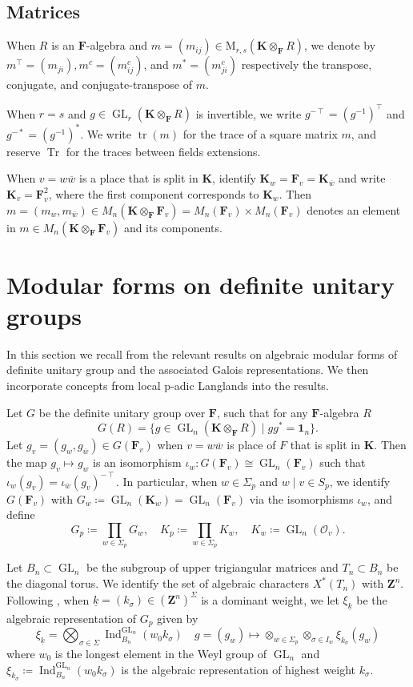 \documentclass[leqno]{amsart}
\newcommand{\wt}[1]{\underline{ #1 }}
\newcommand{\bw}{\overline{w}}
\DeclareMathOperator{\GL}{GL}
\DeclareMathOperator{\mtr}{tr}
\newcommand{\id}{\mathbf{1}}
\newcommand{\Z}{{\mathbf{Z}}}
\DeclareMathOperator{\Tr}{Tr} %
\newcommand{\F}{{\mathbf{F}}} %
\newcommand{\K}{{\mathbf{K}}} %
\newcommand{\oo}{\mathcal{O}} %
\DeclareMathOperator{\Ind}{Ind}
\theoremstyle{definition}
\theoremstyle{remark}
\begin{document}
\subsection{Matrices}
When $R$ is an $\F$-algebra and 
$m=(m_{ij})\in \text{M}_{r,s}(\K\otimes_\F R)$,
we denote by 
$m^\intercal=(m_{ji}), 
m^c=(m^c_{ij})$, and
$m^*=(m^c_{ji})$
respectively the transpose, conjugate, and conjugate-transpose of $m$.

When $r=s$ and $g\in \GL_r(\K\otimes_\F R)$ is invertible, we write
$g^{-\intercal}=(g^{-1})^\intercal$ and $g^{-*}=(g^{-1})^*$.
We write $\mtr(m)$ for the trace of a square matrix $m$,
and reserve $\Tr$ for the traces between fields extensions.

When $v=w\bw$ is a place that is split in $\K$,
identify $\K_w=\F_v=\K_{\bw}$ and 
write $\K_v=\F_v^2$, 
where the first component corresponds to $\K_w$.
Then $m=(m_w,m_{\bw})\in M_n(\K\otimes_\F\F_v)=M_n(\F_v)\times M_n(\F_v)$ 
denotes an element in $m\in M_n(\K\otimes_\F\F_v)$ and its components.


\section{Modular forms on definite unitary groups}

In this section
we recall from \cite{ger} the relevant
results on algebraic modular forms 
of definite unitary group
and the associated Galois representations.
We then incorporate concepts from local p-adic Langlands
into the results.

Let $G$ be the definite unitary group over $\F$,
such that for any $\F$-algebra $R$
\[
    G(R)=\{g\in \GL_{n}(\K\otimes_\F R) \mid gg^*=\id_n\}.
\]
Let $g_v=(g_w,g_{\bw})\in G(\F_v)$
when $v=w\bw$ is place of $F$ that is split in $\K$.
Then the map $g_v\mapsto g_w$ is an isomorphism
$\iota_w\colon G(\F_v)\cong \GL_n(\F_v)$
such that 
$\iota_w(g_v)=\iota_{\bw}(g_v)^{-\intercal}$.
In particular, when $w\in \Sigma_p$ and  $w\mid v\in S_p$,
we identify $G(\F_v)$ with 
$G_{w}\coloneqq\GL_n(\K_w)=\GL_n(\F_v)$ 
via the isomorphisms $\iota_w$, and define 
\[
	G_p\coloneqq\prod_{w\in \Sigma_p}G_w,\quad
	K_p\coloneqq\prod_{w\in \Sigma_p}K_w,\quad
	K_w\coloneqq\GL_n(\oo_v).
\]

Let $B_n\subset \GL_n$ be the subgroup of
upper trigiangular matrices
and $T_n\subset B_n$ be the diagonal torus.
We identify the set of algebraic characters $X^*(T_n)$
with  $\Z^n$.
Following \cite[Defn 2.3]{ger},
when $\wt{k}=(k_\sigma)\in (\Z^n)^{\Sigma}$ 
is a dominant weight, 
we let $\xi_{\wt{k}}$ be the algebraic representation 
of $G_p$ given by 
\[
	\xi_{\wt{k}}=\bigotimes_{\sigma\in \Sigma}
	\Ind_{B_n}^{\GL_n}(w_0k_{\sigma})\quad
	g=(g_w)\mapsto 
	\otimes_{w\in \Sigma_p}
	\otimes_{\sigma\in I_w}\xi_{k_\sigma}(g_w)
\]
where $w_0$ is the longest element in the Weyl group of
$\GL_n$ and  
$\xi_{k_\sigma}\coloneqq\Ind_{B_n}^{\GL_n}(w_0k_{\sigma})$
is the algebraic representation of highest weight $k_\sigma$.
\end{document}
